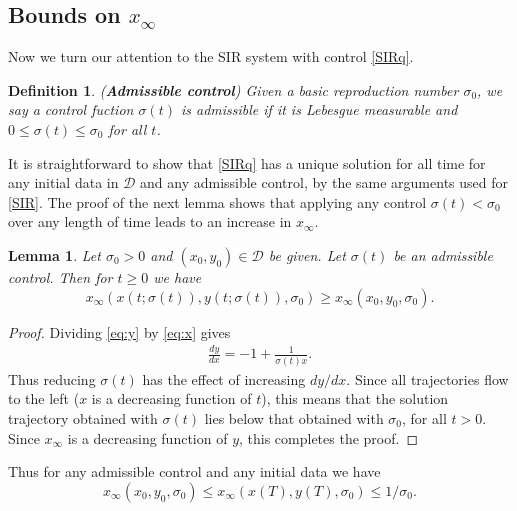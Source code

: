 \documentclass[english,12pt,letter]{article}
\newtheorem{lem}{Lemma}
\newtheorem{dfn}{Definition}
\newcommand{\Rnot}{\sigma_0}
\newcommand{\Sinf}{x_\infty}
\newcommand{\dom}{{\mathcal D}}
\begin{document}
\subsection{Bounds on $\Sinf$}
Now we turn our attention to the SIR system with control \eqref{SIRq}.

\begin{dfn} ({\bf Admissible control})
Given a basic reproduction number $\Rnot$, we say a control fuction $\sigma(t)$ is
admissible if it is Lebesgue measurable and $0\le \sigma(t) \le \sigma_0$ for all $t$.
\end{dfn}

It is straightforward to show that \eqref{SIRq} has a unique solution for all time
for any initial data in $\dom$ and any admissible control, by the same
arguments used for \eqref{SIR}.
The proof of the next lemma shows that applying any control $\sigma(t)<\Rnot$ over
any length of time leads to an increase in $x_\infty$.
\begin{lem}
Let $\Rnot>0$ and $(x_0,y_0)\in\dom$ be given. %
Let $\sigma(t)$ be an admissible control.  Then for $t\ge0$ we have
$$
    x_\infty(x(t;\sigma(t)),y(t;\sigma(t)),\Rnot) \ge x_\infty(x_0,y_0,\Rnot).
$$
\end{lem}
\begin{proof}
    Dividing \eqref{eq:y} by \eqref{eq:x} gives
    \begin{align} \label{eq:dydx}
        \frac{dy}{dx} = -1 + \frac{1}{\sigma(t) x}.
    \end{align}
    Thus reducing $\sigma(t)$ has the effect of increasing $dy/dx$.
    Since all trajectories flow to the left ($x$ is a decreasing function of $t$),
    this means that the solution trajectory obtained with $\sigma(t)$ lies
    below that obtained with $\sigma_0$, for all $t>0$.  Since
    $\Sinf$ is a decreasing function of $y$, this completes the proof.
\end{proof}

Thus for any admissible control and any initial data we have
$$
\Sinf(x_0,y_0,\Rnot) \le \Sinf(x(T),y(T),\Rnot) \le 1/\Rnot.
$$
\end{document}
